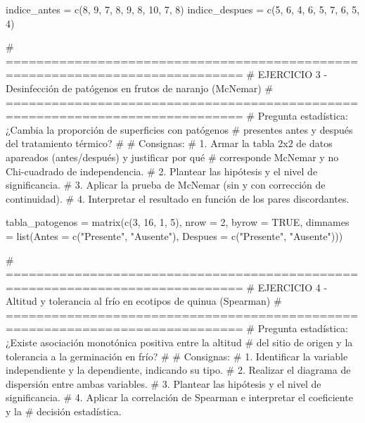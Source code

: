 \documentclass[
  spanish,
  letterpaper,
  DIV=11,
  numbers=noendperiod]{scrreprt}
\newenvironment{Shaded}{\begin{snugshade}}{\end{snugshade}}
\newcommand{\AttributeTok}[1]{\textcolor[rgb]{0.40,0.45,0.13}{#1}}
\newcommand{\CommentTok}[1]{\textcolor[rgb]{0.37,0.37,0.37}{#1}}
\newcommand{\ConstantTok}[1]{\textcolor[rgb]{0.56,0.35,0.01}{#1}}
\newcommand{\DecValTok}[1]{\textcolor[rgb]{0.68,0.00,0.00}{#1}}
\newcommand{\FunctionTok}[1]{\textcolor[rgb]{0.28,0.35,0.67}{#1}}
\newcommand{\NormalTok}[1]{\textcolor[rgb]{0.00,0.23,0.31}{#1}}
\newcommand{\OtherTok}[1]{\textcolor[rgb]{0.00,0.23,0.31}{#1}}
\newcommand{\StringTok}[1]{\textcolor[rgb]{0.13,0.47,0.30}{#1}}
\begin{document}
\begin{Shaded}
\begin{Highlighting}[]
\NormalTok{indice\_antes   }\OtherTok{=} \FunctionTok{c}\NormalTok{(}\DecValTok{8}\NormalTok{, }\DecValTok{9}\NormalTok{, }\DecValTok{7}\NormalTok{, }\DecValTok{8}\NormalTok{, }\DecValTok{9}\NormalTok{, }\DecValTok{8}\NormalTok{, }\DecValTok{10}\NormalTok{, }\DecValTok{7}\NormalTok{, }\DecValTok{8}\NormalTok{)}
\NormalTok{indice\_despues }\OtherTok{=} \FunctionTok{c}\NormalTok{(}\DecValTok{5}\NormalTok{, }\DecValTok{6}\NormalTok{, }\DecValTok{4}\NormalTok{, }\DecValTok{6}\NormalTok{, }\DecValTok{5}\NormalTok{, }\DecValTok{7}\NormalTok{, }\DecValTok{6}\NormalTok{, }\DecValTok{5}\NormalTok{, }\DecValTok{4}\NormalTok{)}


\CommentTok{\# =============================================================================}
\CommentTok{\# EJERCICIO 3 {-} Desinfección de patógenos en frutos de naranjo (McNemar)}
\CommentTok{\# =============================================================================}
\CommentTok{\# Pregunta estadística: ¿Cambia la proporción de superficies con patógenos}
\CommentTok{\# presentes antes y después del tratamiento térmico?}
\CommentTok{\#}
\CommentTok{\# Consignas:}
\CommentTok{\# 1. Armar la tabla 2x2 de datos apareados (antes/después) y justificar por qué}
\CommentTok{\#    corresponde McNemar y no Chi{-}cuadrado de independencia.}
\CommentTok{\# 2. Plantear las hipótesis y el nivel de significancia.}
\CommentTok{\# 3. Aplicar la prueba de McNemar (sin y con corrección de continuidad).}
\CommentTok{\# 4. Interpretar el resultado en función de los pares discordantes.}

\NormalTok{tabla\_patogenos }\OtherTok{=} \FunctionTok{matrix}\NormalTok{(}\FunctionTok{c}\NormalTok{(}\DecValTok{3}\NormalTok{, }\DecValTok{16}\NormalTok{, }\DecValTok{1}\NormalTok{, }\DecValTok{5}\NormalTok{), }\AttributeTok{nrow =} \DecValTok{2}\NormalTok{, }\AttributeTok{byrow =} \ConstantTok{TRUE}\NormalTok{,}
                         \AttributeTok{dimnames =} \FunctionTok{list}\NormalTok{(}\AttributeTok{Antes =} \FunctionTok{c}\NormalTok{(}\StringTok{"Presente"}\NormalTok{, }\StringTok{"Ausente"}\NormalTok{),}
                                         \AttributeTok{Despues =} \FunctionTok{c}\NormalTok{(}\StringTok{"Presente"}\NormalTok{, }\StringTok{"Ausente"}\NormalTok{)))}


\CommentTok{\# =============================================================================}
\CommentTok{\# EJERCICIO 4 {-} Altitud y tolerancia al frío en ecotipos de quinua (Spearman)}
\CommentTok{\# =============================================================================}
\CommentTok{\# Pregunta estadística: ¿Existe asociación monotónica positiva entre la altitud}
\CommentTok{\# del sitio de origen y la tolerancia a la germinación en frío?}
\CommentTok{\#}
\CommentTok{\# Consignas:}
\CommentTok{\# 1. Identificar la variable independiente y la dependiente, indicando su tipo.}
\CommentTok{\# 2. Realizar el diagrama de dispersión entre ambas variables.}
\CommentTok{\# 3. Plantear las hipótesis y el nivel de significancia.}
\CommentTok{\# 4. Aplicar la correlación de Spearman e interpretar el coeficiente y la}
\CommentTok{\#    decisión estadística.}


\end{Highlighting}
\end{Shaded}
\end{document}
